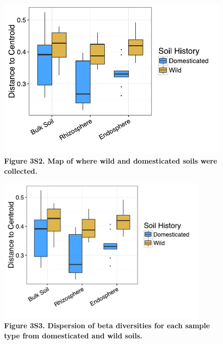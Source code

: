 \begin{figure}[h]
\centering
\includegraphics[width=6in]{Figures/figure2_s2}
\captionsetup{labelformat=empty}
\caption[Figure 3S2]{\textbf{Figure 3S2. Map of where wild and domesticated soils were collected.}}
\label{Figure 3S2}
\end{figure}

\newpage

\begin{figure}[h]
\centering
\includegraphics[width=4in]{Figures/figure2_s3}
\captionsetup{labelformat=empty}
\caption[Figure 3S3]{\textbf{Figure 3S3. Dispersion of beta diversities for each sample type from domesticated and wild soils.}}
\label{Figure 3S3}
\end{figure}